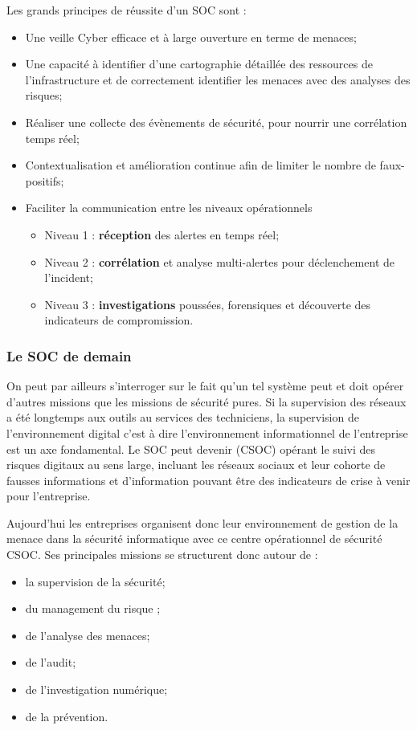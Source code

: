 Les grands principes de réussite d’un SOC sont : 

\begin{itemize}
  \item Une veille Cyber efficace et à large ouverture en terme de menaces;
  \item Une capacité à identifier d’une cartographie détaillée des ressources de l’infrastructure et de correctement identifier les menaces avec des analyses des risques;
  \item Réaliser une collecte des évènements de sécurité, pour nourrir une corrélation temps réel;
  \item Contextualisation et amélioration continue afin de limiter le nombre de faux-positifs;
  \item Faciliter la communication entre les niveaux opérationnels
\begin{itemize}
\item Niveau 1 : \textbf{réception} des alertes en temps réel;
\item Niveau 2 : \textbf{corrélation} et analyse multi-alertes pour déclenchement de l’incident;
\item Niveau 3 : \textbf{investigations} poussées, forensiques et découverte des indicateurs de compromission.
\end{itemize}
\end{itemize}


\subsubsection{Le SOC de demain}
On peut par ailleurs s'interroger sur le fait qu'un tel système peut et doit opérer d'autres missions que les missions de sécurité pures. Si la supervision des réseaux a été longtemps aux outils au services des techniciens, la supervision de l'environnement digital c'est à dire l'environnement informationnel de l'entreprise est un axe fondamental. Le SOC peut devenir  (CSOC) opérant le suivi des risques digitaux au sens large, incluant les réseaux sociaux et leur cohorte de fausses informations et d'information pouvant être des indicateurs de crise à venir pour l'entreprise.

Aujourd’hui les entreprises organisent donc leur environnement de gestion de la menace dans la sécurité informatique avec ce centre opérationnel de sécurité CSOC. Ses principales missions se structurent donc autour de  : 

\begin{itemize}
  \item la supervision de la sécurité;
  \item du management du risque ;
  \item de l’analyse des menaces;
  \item de l’audit;
  \item de l’investigation numérique;
  \item de la prévention.
\end{itemize}

